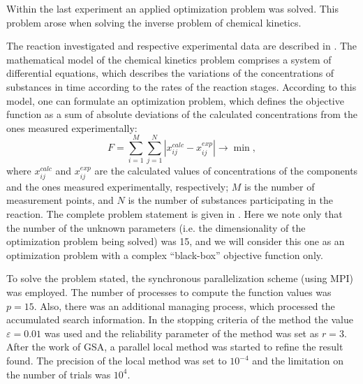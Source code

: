 \documentclass[runningheads]{llncs}
\begin{document}
Within the last experiment an applied optimization problem was solved. This problem arose when solving the inverse problem of chemical kinetics.

The reaction investigated and respective experimental data are described in \cite{Uskov2020}. The mathematical model of the chemical kinetics problem comprises a system of differential equations, which describes the variations of the concentrations of substances in time according to the rates of the reaction stages. According to this model, one can formulate an optimization problem, which defines the objective function as a sum of absolute deviations of the calculated concentrations from the ones measured experimentally:
\[
F = \sum_{i=1}^{M} \sum_{j=1}^{N} \left| x_{ij}^{calc} - x_{ij}^{exp} \right| \rightarrow \min,
\]
where $x_{ij}^{calc}$ and $x_{ij}^{exp}$ are the calculated values of concentrations of the components and the ones measured experimentally, respectively; $M$ is the number of measurement points, and $N$ is the number of substances participating in the reaction. The complete problem statement is given in \cite{Uskov2020}. Here we note only that the number of the unknown parameters (i.e. the dimensionality of the optimization problem being solved) was 15, and we will consider this one as an optimization problem with a complex ``black-box'' objective function only.

To solve the problem stated, the synchronous parallelization scheme (using MPI) was employed. The number of processes to compute the function values was $p=15$. Also, there was an additional managing process, which processed the accumulated search information. In the stopping criteria of the method the value $\varepsilon=0.01$ was used and the reliability parameter of the method was set as $r = 3$. After the work of GSA, a parallel local method was started to refine the result found. The precision of the local method was set to $10^{-4}$ and the limitation on the number of trials was $10^4$. 
\end{document}
